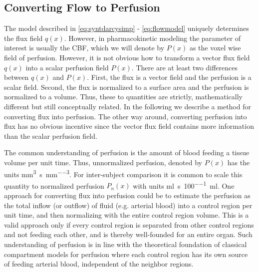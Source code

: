 \documentclass[paper=a4, fontsize=11pt,parskip=half,headings=small]{scrartcl}
\newcommand{\siQmm}{\milli\meter\cubed\per\second\per\milli\meter\cubed}
\newcommand{\siPml}{\milli\litre\per\second\per100\milli\litre}
\begin{document}
	
	
	\subsection{Converting Flow to Perfusion}\label{sec:flux2perf}
	The model described in \eqref{eq:syntdarcysimp} - \eqref{eq:flowmodel} uniquely determines the flux field $q(x)$. 
	However, in pharmacokinetic modeling the parameter of interest is usually the CBF, which we will denote by $P(x)$ as the voxel wise field of perfusion. However, 
	it is not obvious how to transform a vector flux field $q(x)$ into a scalar perfusion field $P(x)$.
	There are at least two differences between $q(x)$ and $P(x)$. 
	First, the flux is a vector field and the perfusion is a scalar field. 
	Second, the flux is normalized to a surface area and the perfusion is normalized to a volume. 
	Thus, these to quantities are strictly, mathematically different but still conceptually related. 
	In the following we describe a method for converting flux into perfusion. The other way around, converting perfusion into flux has no obvious incentive since the vector flux field contains more information than the scalar perfusion field.

	The common understanding of perfusion is the amount of blood feeding a tissue volume per unit time. 
	Thus, unnormalized perfusion, denoted by $P(x)$ has the units \si{\siQmm}.
	For inter-subject comparison it is common to scale this quantity to normalized perfusion $P_n(x)$ with units \si{\siPml}. 
	One approach for converting flux into perfusion could be to estimate the perfusion as the total inflow (or outflow) of fluid (e.g. arterial blood) into a control region per unit time, and then normalizing with the entire control region volume. 
	This is a valid approach only if every control region is separated from other control regions and not feeding each other, and is thereby well-founded 
	for an entire organ. 
	Such understanding of perfusion is in line with the theoretical foundation of classical compartment models for perfusion where each control region has its own source of feeding arterial blood, independent of the neighbor regions. 
	
\end{document}
